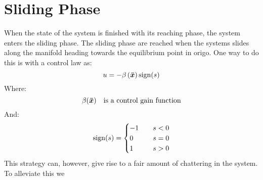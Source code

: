 \chapter{Sliding Phase}
When the state of the system is finished with its reaching phase, the system enters the sliding phase. The sliding phase are reached when the systems slides along the manifold heading towards the equilibrium point in origo. One way to do this is with a control law as:
\begin{equation}
  u = -\beta \left( \bm{\bar{x}} \right)\mathrm{sign}(s)
\end{equation}
Where:
\begin{equation}
  \beta (\bm{\bar{x}}) \quad\text{is a control gain function}
\nonumber
\end{equation}
And:
\begin{equation}
  \mathrm{sign}(s) =
  \begin{cases}
    -1 & \quad s < 0 \\
    0 & \quad s = 0 \\
    1 & \quad s > 0
  \end{cases}
\nonumber
\end{equation}
This strategy can, however, give rise to a fair amount of chattering in the system. To alleviate this we 
